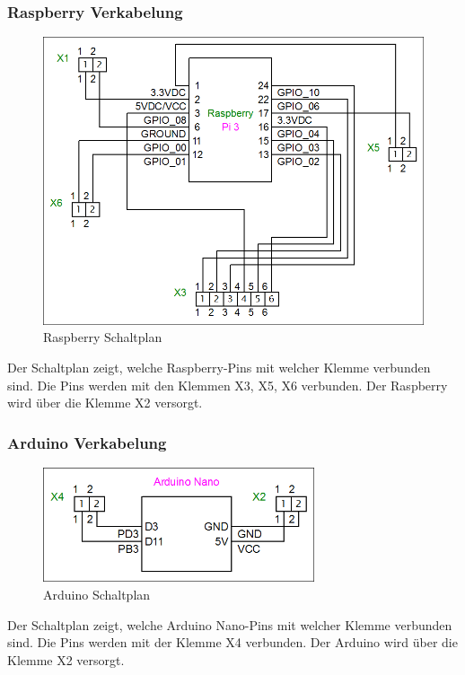 \subsubsection{Raspberry Verkabelung}
\begin{figure}[H] 
\begin{center}

\includegraphics[width=15cm]{Bilder/Schaltplan/Raspberry_Verkabelung}
\caption{Raspberry Schaltplan}
\label{Rasp_Circuit}

\end{center}
\end{figure}
Der Schaltplan zeigt, welche Raspberry-Pins mit welcher Klemme verbunden sind.
Die Pins werden mit den Klemmen X3, X5, X6 verbunden.
Der Raspberry wird über die Klemme X2 versorgt.

\subsubsection{Arduino Verkabelung}
\begin{figure}[H] 
\begin{center}

\includegraphics[width=8cm]{Bilder/Schaltplan/Arduino_Verkabelung}
\caption{Arduino Schaltplan}
\label{Ard_Circuit}

\end{center}
\end{figure}
Der Schaltplan zeigt, welche Arduino Nano-Pins mit welcher Klemme verbunden sind.
Die Pins werden mit der Klemme X4 verbunden.
Der Arduino wird über die Klemme X2 versorgt.

